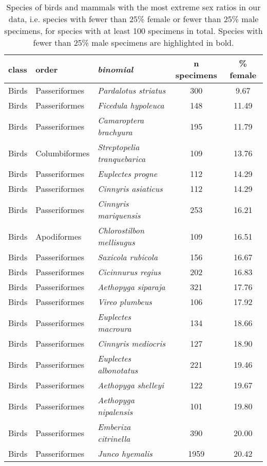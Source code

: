 \begin{longtable}{ll>{\itshape}lcc}
\caption{Species of birds and mammals with the most extreme sex ratios
                  in our data, i.e. species with fewer than 25\% female or fewer 
                  than 25\% male specimens, for species with at least 100 specimens
                  in total. Species with  fewer than 25\% male specimens are highlighted 
                  in bold.} \\ 
  \hline
\textbf{class} & \textbf{order} & \textbf{binomial} & \textbf{n specimens} & \textbf{\% female} \\ 
  \hline
Birds & Passeriformes & Pardalotus striatus & 300 & 9.67 \\ 
  Birds & Passeriformes & Ficedula hypoleuca & 148 & 11.49 \\ 
  Birds & Passeriformes & Camaroptera brachyura & 195 & 11.79 \\ 
  Birds & Columbiformes & Streptopelia tranquebarica & 109 & 13.76 \\ 
  Birds & Passeriformes & Euplectes progne & 112 & 14.29 \\ 
  Birds & Passeriformes & Cinnyris asiaticus & 112 & 14.29 \\ 
  Birds & Passeriformes & Cinnyris mariquensis & 253 & 16.21 \\ 
  Birds & Apodiformes & Chlorostilbon mellisugus & 109 & 16.51 \\ 
  Birds & Passeriformes & Saxicola rubicola & 156 & 16.67 \\ 
  Birds & Passeriformes & Cicinnurus regius & 202 & 16.83 \\ 
  Birds & Passeriformes & Aethopyga siparaja & 321 & 17.76 \\ 
  Birds & Passeriformes & Vireo plumbeus & 106 & 17.92 \\ 
  Birds & Passeriformes & Euplectes macroura & 134 & 18.66 \\ 
  Birds & Passeriformes & Cinnyris mediocris & 127 & 18.90 \\ 
  Birds & Passeriformes & Euplectes albonotatus & 221 & 19.46 \\ 
  Birds & Passeriformes & Aethopyga shelleyi & 122 & 19.67 \\ 
  Birds & Passeriformes & Aethopyga nipalensis & 101 & 19.80 \\ 
  Birds & Passeriformes & Emberiza citrinella & 390 & 20.00 \\ 
  Birds & Passeriformes & Junco hyemalis & 1959 & 20.42 \\ 

\end{longtable}
